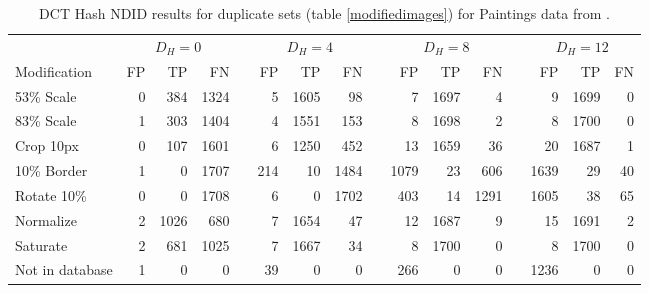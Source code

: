 \documentclass[english,12pt,a4paper,pdftex,elec,utf8, table]{aaltothesis}
\begin{document}
\begin{table}[htb]\footnotesize
\caption{ DCT Hash NDID results for duplicate sets (table \ref{modifiedimages}) for Paintings data from \cite{Vedaldi2012}. }
\label{dctresults}
\begin{center}
  \setlength\tabcolsep{3pt} %
  \begin{tabular}{@{}lrrrrrrrrrrrrrrr@{}}
    \toprule
    & \multicolumn{3}{c}{$D_H = 0$} &\phantom{abc} &\multicolumn{3}{c}{$D_H = 4$} &\phantom{abc} & \multicolumn{3}{c}{$D_H=8$} &\phantom{abc} & \multicolumn{3}{c}{$D_H=12$}\\
\cmidrule{2-4} \cmidrule{6-8} \cmidrule{10-12} \cmidrule{14-16}
    Modification & FP & TP & FN &\phantom{abc} & FP & TP & FN &\phantom{abc} & FP & TP & FN &\phantom{abc} & FP & TP & FN\\ \midrule
    53\% Scale   & 0 & 384 & 1324 &\phantom{abc} & 5 & 1605 & 98 &\phantom{abc} & 7 & 1697 & 4 &\phantom{abc} & 9 & 1699 & 0\\
    83\% Scale   & 1 & 303 & 1404 &\phantom{abc} & 4 & 1551 & 153 &\phantom{abc} & 8 & 1698 & 2 &\phantom{abc} & 8 & 1700 & 0\\
    Crop 10px    & 0 & 107 & 1601 &\phantom{abc} & 6 & 1250 & 452 &\phantom{abc} & 13& 1659 & 36 &\phantom{abc} & 20 & 1687 & 1\\
    10\% Border  & 1 & 0 & 1707 & \phantom{abc} & 214 & 10 & 1484 &\phantom{abc} & 1079 & 23 & 606 &\phantom{abc} & 1639 & 29 & 40\\
    Rotate 10\%  & 0 & 0 & 1708 &\phantom{abc} & 6 & 0 & 1702 &\phantom{abc} & 403 & 14 & 1291 &\phantom{abc} & 1605 & 38 & 65\\
    Normalize    & 2 & 1026 & 680 &\phantom{abc} & 7 & 1654 & 47 &\phantom{abc} & 12 & 1687 & 9 &\phantom{abc} & 15 & 1691 & 2\\
    Saturate     & 2 & 681 & 1025 &\phantom{abc} & 7 & 1667 & 34 &\phantom{abc} & 8 & 1700 & 0 &\phantom{abc} & 8 & 1700 & 0\\
    Not in database & 1 & 0 & 0 &\phantom{abc} & 39 & 0 & 0 &\phantom{abc} & 266 & 0 & 0 &\phantom{abc} & 1236 & 0 & 0\\

    \bottomrule
\end{tabular}
\end{center}
\end{table}
\end{document}
